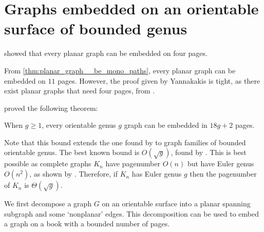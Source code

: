 
\section{Graphs embedded on an orientable surface of bounded genus}\label{sec:pagenumber_bounded_genus}

\textcite{yannakakisEmbeddingPlanarGraphs1989} showed that every planar graph can be embedded on four pages.

From \cref{thm:planar_graph__be_mono_paths}, every planar graph can be embedded on $11$ pages. However, the proof given by Yannakakis is tight, as there exist planar graphs that need four pages, from \textcite{yannakakisPlanarGraphsThat2020,bekosFourPagesAre2020}. 

\textcite{heathPagenumberGenusGraphs1992} proved the following theorem:
\begin{theorem}\label{thm:Genus_pagenumber_bound}
	When $g \geq 1$, every orientable genus $g$ graph can be embedded in $18g+2$ pages.
\end{theorem}
Note that this bound extends the one found by \textcite{yannakakisEmbeddingPlanarGraphs1989} to graph families of bounded orientable genus.
The best known bound is \(O(\sqrt{g})\), found by \textcite{malitzGenusGraphsHave1994}. This is best possible as complete graphs $K_n$ have pagenumber $O(n)$ but have Euler genus $O(n^2)$, as shown by \textcite{ringelMapColorTheorem1974}. Therefore, if $K_n$ has Euler genus $g$ then the pagenumber of $K_n$ is $\Theta(\sqrt{g})$.


We first decompose a graph $G$ on an orientable surface into a planar spanning subgraph and some `nonplanar' edges. This decomposition can be used to embed a graph on a book with a bounded number of pages.

